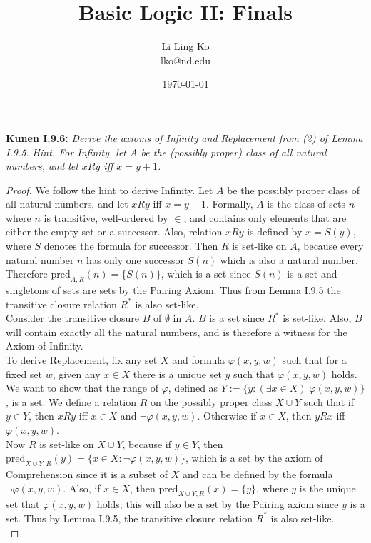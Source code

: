 \documentclass{article}
\begin{document}
\title{Basic Logic II: Finals}
\author{Li Ling Ko\\ lko@nd.edu}
\date{\today}
\maketitle

\textbf{Kunen I.9.6:} \it Derive the axioms of Infinity and Replacement
  from (2) of Lemma I.9.5. Hint. For Infinity, let $A$ be the
  (possibly proper) class of all natural numbers, and let $xRy$ iff
  $x=y+1$.

  \begin{proof}
    We follow the hint to derive Infinity. Let $A$ be the
    possibly proper class of all natural numbers, and let $xRy$ iff
    $x=y+1$. Formally, $A$ is the class of sets $n$ where $n$
    is transitive, well-ordered by $\in$, and contains only elements that
    are either the empty set or a successor. Also, relation $xRy$ is
    defined by $x=S(y)$, where $S$ denotes the formula for successor. Then
    $R$ is set-like on $A$, because every natural number $n$ has only one
    successor $S(n)$ which is also a natural number. Therefore
    $\text{pred}_{A,R}(n) =\{S(n)\}$, which is a set since $S(n)$ is a set
    and singletons of sets are sets by the Pairing Axiom. Thus from Lemma
    I.9.5 the transitive closure relation $R^*$ is also set-like. \\

    Consider the transitive closure $B$ of $\emptyset$ in $A$. $B$ is a set
    since $R^*$ is set-like. Also, $B$ will contain exactly all the natural
    numbers, and is therefore a witness for the Axiom of Infinity. \\

    To derive Replacement, fix any set $X$ and formula $\varphi(x,y,w)$
    such that for a fixed set $w$, given any $x\in X$ there is a unique set
    $y$ such that $\varphi(x,y,w)$ holds. We want to show that the range of
    $\varphi$, defined as $Y :=\{y: (\exists x\in X)\; \varphi(x,y,w)\}$,
    is a set. We define a relation $R$ on the possibly proper class $X\cup
    Y$ such that if $y\in Y$, then $xRy$ iff $x\in X$ and
    $\neg\varphi(x,y,w)$. Otherwise if $x\in X$, then $yRx$ iff
    $\varphi(x,y,w)$. \\

    Now $R$ is set-like on $X\cup Y$, because if $y\in Y$, then
    $\text{pred}_{X\cup Y,R}(y) =\{x\in X: \neg\varphi(x,y,w)\}$, which is
    a set by the axiom of Comprehension since it is a subset of $X$ and can
    be defined by the formula $\neg\varphi(x,y,w)$. Also, if $x\in X$,
    then $\text{pred}_{X\cup Y,R}(x)=\{y\}$, where $y$ is the unique set
    that $\varphi(x,y,w)$ holds; this will also be a set by the Pairing
    axiom since $y$ is a set. Thus by Lemma I.9.5, the transitive closure
    relation $R^*$ is also set-like. \\


\end{proof}
\end{document}
